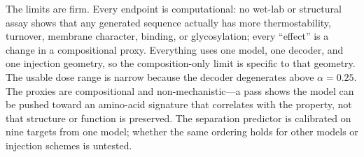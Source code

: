 \documentclass[11pt]{article}
\begin{document}
The limits are firm. Every endpoint is computational: no wet-lab or structural
assay shows that any generated sequence actually has more thermostability,
turnover, membrane character, binding, or glycosylation; every ``effect'' is a
change in a compositional proxy. Everything uses one model, one decoder, and one
injection geometry, so the composition-only limit is specific to that geometry.
The usable dose range is narrow because the decoder degenerates above
$\alpha=0.25$. The proxies are compositional and non-mechanistic---a pass shows
the model can be pushed toward an amino-acid signature that correlates with the
property, not that structure or function is preserved. The separation predictor
is calibrated on nine targets from one model; whether the same ordering holds
for other models or injection schemes is untested.



\end{document}
